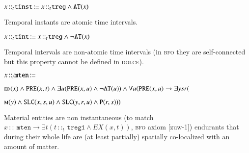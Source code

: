 \documentclass[ao]{iosart2x}
\newcommand{\bfoAxLabel}{\textrm{a$_\texttt{b}$}}
\newcommand{\dbDefLabel}{\textrm{d$_\texttt{db}$}}
\newcounter{cntdbdf}
\newcommand{\dbdf}[1]{\refstepcounter{cntdbdf}\begin{small}{\bf \dbDefLabel\thecntdbdf\label{#1}}\end{small}}
\newcommand{\refbfoax}[1]{({\bfoAxLabel}\ref{#1})}
\newcommand{\pr}[1]{\mathtt{#1}}
\newcommand{\prbfo}[1]{{\textit{{#1}}}}
\newcommand{\cn}[1]{\mathtt{#1}}
\newcommand\textequal{%
 \rule[.08ex]{5pt}{0.35pt}\llap{\rule[.78ex]{5pt}{0.35pt}}}
\newcommand{\sdef}{{\hspace{1.5pt}:\hspace{-2.5pt}\textequal\hspace{3pt}}}
\newcommand{\dolce}{{\textsc{dolce}}}
\newcommand{\bfo}{{\textsc{bfo}}}
\newcommand {\Mdcat} {\textsc{m}}
\newcommand {\ASdcat} {\textsc{as}}
\newcommand {\EDdcat} {\textsc{ed}}
\newcommand {\Pd} {\ensuremath{\pr{P}}}
\newcommand {\ATd} {\ensuremath{\pr{AT}}}
\newcommand {\PREd} {\ensuremath{\pr{PRE}}}
\newcommand {\SDd} {\ensuremath{\pr{SD}}}
\newcommand {\SLCd} {\ensuremath{\pr{SLC}}}
\newcommand{\mtenbcat}{\cn{mten}}
\newcommand{\procbcat}{\cn{proc}}
\newcommand{\pbndbcat}{\cn{pbnd}}
\newcommand{\tregbcat}{\cn{treg}}
\newcommand{\stregbcat}{\cn{streg}}
\newcommand{\tinstbcat}{\cn{tinst}}
\newcommand{\tintbcat}{\cn{tint}}
\newcommand{\onetregbcat}{\cn{treg1}}
\newcommand{\bfoexist}{\prbfo{EX}}
\newcommand{\bfoiof}[1]{{\,::_{#1\:\!}}}
\begin{document}
%

\item[\dbdf{d2b_tinst}]  $x \bfoiof{t} \tinstbcat \sdef x \bfoiof{t} \tregbcat \land \ATd(x)$

\vspace{1pt}
Temporal instants are atomic time intervals.

% 

\item[\dbdf{d2b_tint}] $x \bfoiof{t} \tintbcat \sdef x \bfoiof{t} \tregbcat \land \neg\ATd(x)$

\vspace{1pt}
Temporal intervals are non-atomic time intervals (in {\bfo} they are self-connected but this property cannot be defined in {\dolce}).

%

\item[\dbdf{d2b_mten}] $x \bfoiof{t} \mtenbcat \sdef \ $\parbox[t]{\textwidth}{$\EDdcat(x) \land 
\PREd(x,t) \land \exists u(\PREd(x,u) \land \neg \ATd(u)) \land \\
\forall u(\PREd(x,u) \to \exists ysr($\parbox[t]{\textwidth}{$\Mdcat(y) \land \SLCd(x,s,u) \land \SLCd(y,r,u) \land \Pd(r,s)))$}}

\vspace{1pt}
Material entities are non instantaneous (to match $x \bfoiof{} \mtenbcat \to \exists t(t \bfoiof{t} \onetregbcat \land \bfoexist(x,t))$, {\bfo} axiom [zuw-1]) endurants that during their whole life are (at least partially) spatially co-localized with an amount of matter.
\end{document}
